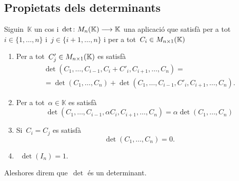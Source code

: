 \documentclass[../../Main.tex]{subfiles}
\begin{document}
	\subsection{Propietats dels determinants}
	\begin{definition}[Determinant]
		\label{def:determinant d'una matriu}
		Siguin~\(\mathbb{K}\) un cos i~\(\det\colon M_{n}(\mathbb{K})\longrightarrow\mathbb{K}\) una aplicació que satisfà per a tot~\(i\in\{1,\dots,n\}\) i~\(j\in\{i+1,\dots,n\}\) i per a tot~\(C_{i}\in M_{n\times1}(\mathbb{K})\)
		\begin{enumerate}
			\item Per a tot~\(C'_{j}\in M_{n\times1}(\mathbb{K})\) es satisfà
			\begin{multline*}
			\det(C_{1},\dots,C_{i-1},C_{i}+C'_{i},C_{i+1},\dots,C_{n})=\\
			=\det(C_{1},\dots,C_{n})+\det(C_{1},\dots,C_{i-1},C'_{i},C_{i+1},\dots,C_{n}).
			\end{multline*}
			\item Per a tot~\(\alpha\in\mathbb{K}\) es satisfà
			\[
			    \det(C_{1},\dots,C_{i-1},\alpha C_{i},C_{i+1},\dots,C_{n})=\alpha\det(C_{1},\dots,C_{n})
			\]
			\item Si~\(C_{i}=C_{j}\) es satisfà
			\[
			    \det(C_{1},\dots,C_{n})=0.
			\]
			\item~\(\det(I_{n})=1\).
		\end{enumerate}
		Aleshores direm que~\(\det\) és un determinant.
	\end{definition}
	\begin{proposition}

	\end{proposition}
%
%
\end{document}
